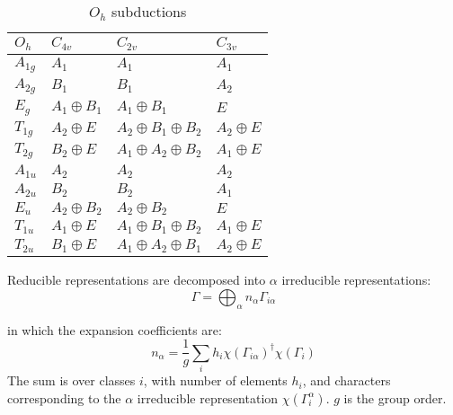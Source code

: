 \documentclass[twocolumn,showpacs,preprintnumbers,superscriptaddress,prb,floatfix,aps,10pt]{revtex4-1}
\begin{document}
\begin{table}
\caption{\label{table:subduction} $O_h$ subductions}
\begin{ruledtabular}
\begin{tabular*}{10cm}{llll}
$O_h$    & $C_{4v}$         & $C_{2v}$                              &   $C_{3v}$            \\ \hline
$A_{1g}$ & $A_1$            & $A_{1}$                               &   $A_1$               \\ 
$A_{2g}$ & $B_1$            & $B_{1}$                               &   $A_2$               \\ 
$E_g   $ & $A_1 \oplus B_1$ & $A_{1} \oplus B_{1}$                  &   $E$                 \\ 
$T_{1g}$ & $A_2 \oplus E$   & $A_{2} \oplus B_{1} \oplus B_{2}$     &   $A_2 \oplus E$      \\ 
$T_{2g}$ & $B_2 \oplus E$   & $A_{1} \oplus A_{2} \oplus B_{2}$     &   $A_1 \oplus E$      \\ 
$A_{1u}$ & $A_2$            & $A_{2}$                               &   $A_2$               \\ 
$A_{2u}$ & $B_2$            & $B_{2}$                               &   $A_1$               \\ 
$E_u   $ & $A_2 \oplus B_2$ & $A_{2} \oplus B_{2}$                  &   $E$                 \\ 
$T_{1u}$ & $A_1 \oplus E$   & $A_{1} \oplus B_{1} \oplus B_{2}$     &   $A_1 \oplus E$      \\ 
$T_{2u}$ & $B_1 \oplus E$   & $A_{1} \oplus A_{2} \oplus B_{1}$     &   $A_2 \oplus E$      \\ 
\end{tabular*}
\end{ruledtabular}
\end{table}

Reducible representations are decomposed into $\alpha$ irreducible representations:
\begin{equation}
\label{eq:irrep_decomposition}
\Gamma = \bigoplus_\alpha n_\alpha \Gamma_{i\alpha}
\end{equation}

in which the expansion coefficients are:
\begin{equation}
\label{eq:irrep_decomposition_coefficients}
n_\alpha = \frac{1}{g} \sum_i h_i \chi\left(\Gamma_{i\alpha}\right)^\dag \chi\left(\Gamma_i\right)
\end{equation}
The sum is over classes $i$, with number of elements $h_i$, and characters corresponding to the $\alpha$ irreducible representation $\chi(\Gamma_i^\alpha)$. $g$ is the group order.
\end{document}
